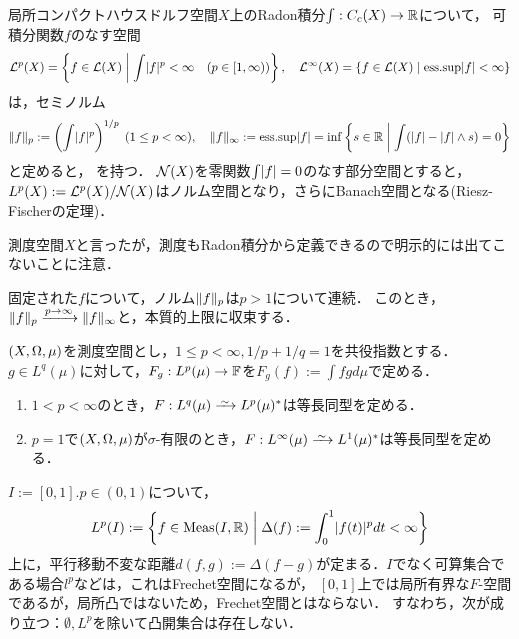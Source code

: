 \documentclass[uplatex,dvipdfmx]{jsreport}
\begin{document}
\begin{example}[測度空間上の体値関数の同値類]\label{exp-Banach-space-of-Radon-integrable-functions}
    局所コンパクトハウスドルフ空間$X$上のRadon積分$\int:C_c(X)\to\mathbb{R}$について，
    可積分関数$f$のなす空間
    \begin{align*}
        \mathcal{L}^p(X)=\left\{f\in\mathcal{L}(X)\;\middle|\;\int\lvert f\rvert^p<\infty\quad(p\in[1,\infty))\right\},\quad\mathcal{L}^\infty(X)=\left\{f\in\mathcal{L}(X)\;\middle|\;\mathrm{ess.sup}\lvert f\rvert<\infty\right\}
    \end{align*}
    は，セミノルム
    \[\|f\|_p:=\left(\int\lvert f\rvert^p\right)^{1/p}\;(1\le p<\infty),\quad\|f\|_\infty:=\mathrm{ess.sup}\lvert f\rvert=\inf\left\{s\in\mathbb{R}\;\middle|\;\int(\lvert f\rvert-\lvert f\rvert\land s)=0\right\}\]と定めると，
    を持つ．
    $\mathcal{N}(X)$を零関数$\int\lvert f\rvert=0$のなす部分空間とすると，$L^p(X):=\mathcal{L}^p(X)/\mathcal{N}(X)$はノルム空間となり，さらにBanach空間となる(Riesz-Fischerの定理)．

    測度空間$X$と言ったが，測度もRadon積分から定義できるので明示的には出てこないことに注意．
\end{example}
\begin{remark}
    固定された$f$について，ノルム$\|f\|_p$は$p>1$について連続．
    このとき，$\|f\|_p\xrightarrow{p\to\infty}\|f\|_\infty$と，本質的上限に収束する．
\end{remark}
    
\begin{theorem}[$L^p$空間の描像]\label{thm-Lp-of-dual-spaces}
    $(X,\Omega,\mu)$を測度空間とし，$1\le p<\infty,1/p+1/q=1$を共役指数とする．
    $g\in L^q(\mu)$に対して，$F_g:L^p(\mu)\to\mathbb{F}$を$F_g(f):=\int fgd\mu$で定める．
    \begin{enumerate}
        \item $1<p<\infty$のとき，$F:L^q(\mu)\iso L^p(\mu)^*$は等長同型を定める．
        \item $p=1$で$(X,\Omega,\mu)$が$\sigma$-有限のとき，$F:L^\infty(\mu)\iso L^1(\mu)^*$は等長同型を定める．
    \end{enumerate}
\end{theorem}

\begin{example}
    $I:=[0,1].p\in(0,1)$について，
    \[L^p(I):=\left\{f\in\mathrm{Meas}(I,\mathbb{R})\;\middle|\;\Delta(f):=\int^1_0\lvert f(t)\rvert^pdt<\infty\right\}\]
    上に，平行移動不変な距離$d(f,g):=\Delta(f-g)$が定まる．$I$でなく可算集合である場合$l^p$などは，これはFrechet空間になるが，
    $[0,1]$上では局所有界な$F$-空間であるが，局所凸ではないため，Frechet空間とはならない．
    すなわち，次が成り立つ：$\emptyset,L^p$を除いて凸開集合は存在しない．
\end{example}
\end{document}
